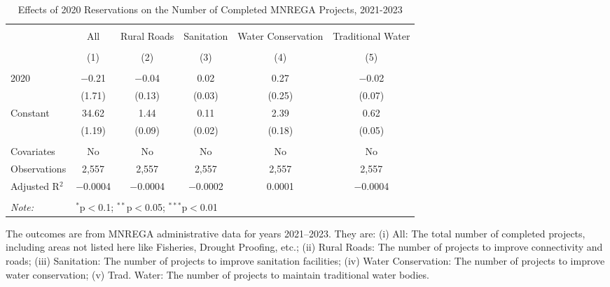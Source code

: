 \begin{table}[!htbp]
\centering
\begin{threeparttable}

  \caption{Effects of 2020 Reservations on the Number of Completed MNREGA Projects, 2021-2023} 
  \label{main_mnrega_20} 
\scriptsize 
\begin{tabular}{@{\extracolsep{0pt}}lccccc} 
\\[-1.8ex]\hline 
\hline \\[-1.8ex] 
 & All & Rural Roads & Sanitation & Water Conservation & Traditional Water \\ 
\\[-1.8ex] & (1) & (2) & (3) & (4) & (5)\\ 
\hline \\[-1.8ex] 
 2020 & $-$0.21 & $-$0.04 & 0.02 & 0.27 & $-$0.02 \\ 
  & (1.71) & (0.13) & (0.03) & (0.25) & (0.07) \\ 
  Constant & 34.62 & 1.44 & 0.11 & 2.39 & 0.62 \\ 
  & (1.19) & (0.09) & (0.02) & (0.18) & (0.05) \\ 
 \hline \\[-1.8ex] 
Covariates & No & No & No & No & No \\ 
Observations & 2,557 & 2,557 & 2,557 & 2,557 & 2,557 \\ 
Adjusted R$^{2}$ & $-$0.0004 & $-$0.0004 & $-$0.0002 & 0.0001 & $-$0.0004 \\ 
\hline 
\hline \\[-1.8ex] 
\textit{Note:}  & \multicolumn{5}{l}{$^{*}$p$<$0.1; $^{**}$p$<$0.05; $^{***}$p$<$0.01} \\ 
\end{tabular} 
\begin{tablenotes}[flushleft]
\scriptsize
\item The outcomes are from MNREGA administrative data for years 2021--2023. They are: 
(i) All: The total number of completed projects, including areas not listed here like Fisheries, Drought Proofing, etc.;
(ii) Rural Roads: The number of projects to improve connectivity and roads;
(iii) Sanitation: The number of projects to improve sanitation facilities;
(iv) Water Conservation: The number of projects to improve water conservation;
(v) Trad. Water: The number of projects to maintain traditional water bodies.
\end{tablenotes}
\end{threeparttable}
\end{table}
